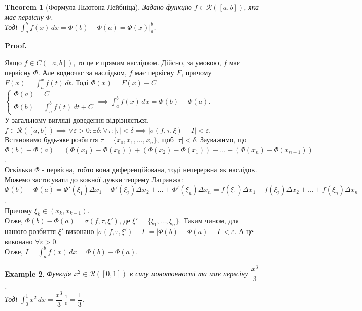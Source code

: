 \documentclass[a4paper, 10pt]{article}
\makeatletter
\def\huge{\displaystyle}
\def\qed{$\blacksquare$}
\theoremstyle{theoremdd}
\newtheorem{theorem}{Theorem}[subsection]
\theoremstyle{theoremdd}
\theoremstyle{theoremdd}
\theoremstyle{theoremdd}
\theoremstyle{theoremdd}
\newtheorem{example}[theorem]{Example}
\theoremstyle{theoremdd}
\theoremstyle{theoremdd}
\theoremstyle{theoremdd}
\theoremstyle{theoremdd}
\renewenvironment{proof}[1][Proof.\\]{\par
\pushQED{\hfill \qed}%
\normalfont \topsep6\p@\@plus6\p@\relax
\trivlist
\item\relax
{\bfseries
#1\@addpunct{.}}\hspace\labelsep\ignorespaces
}{%
\popQED\endtrivlist\@endpefalse
}
\makeatother
\begin{document}
\begin{theorem}[Формула Ньютона-Лейбніца]
Задано функцію $f \in \mathcal{R}([a,b])$, яка має первісну $\Phi$.\\
Тоді $\huge\int_a^b f(x)\,dx = \Phi(b) - \Phi(a) = \Phi(x)\Big|_a^b$.
\end{theorem}

\begin{proof}
Якщо $f \in C([a,b])$, то це є прямим наслідком. Дійсно, за умовою, $f$ має первісну $\Phi$. Але водночас за наслідком, $f$ має первісну $F$, причому $F(x) = \huge\int_a^x f(t)\,dt$. Тоді $\Phi(x) = F(x) + C$\\
$\begin{cases}
\Phi(a) = C \\
\Phi(b) = \huge\int_a^b f(t)\,dt + C
\end{cases} \implies \huge\int_a^b f(x)\,dx = \Phi(b) - \Phi(a)$.
\bigskip \\
У загальному вигляді доведення відрізняється. \\
$f \in \mathcal{R}([a,b]) \implies \forall \varepsilon > 0: \exists \delta: \forall \tau: |\tau| < \delta \implies |\sigma(f, \tau, \xi)-I|<\varepsilon$.\\
Встановимо будь-яке розбиття $\tau = \{x_0,x_1,\dots,x_n\}$, щоб $|\tau| < \delta$. Зауважимо, що\\
$\Phi(b) - \Phi(a) = (\Phi(x_1)-\Phi(x_0)) + (\Phi(x_2)-\Phi(x_1)) + \dots + (\Phi(x_n)-\Phi(x_{n-1}))$.\\
Оскільки $\Phi$ - первісна, тобто вона диференційована, тоді неперервна як наслідок. Можемо застосувати до кожної дужки теорему Лагранжа:\\
$\Phi(b) - \Phi(a) = \Phi'(\xi_1) \Delta x_1 + \Phi'(\xi_2) \Delta x_2 + \dots + \Phi'(\xi_n)\Delta x_n = f(\xi_1)\Delta x_1 + f(\xi_2)\Delta x_2 + \dots + f(\xi_n)\Delta x_n$.\\
Причому $\xi_k \in (x_k,x_{k-1})$.\\
Отже, $\Phi(b) - \Phi(a) = \sigma(f,\tau,\xi')$, де $\xi' = \{\xi_1,\dots,\xi_n\}$. Таким чином, для нашого розбиття $\xi'$ виконано $|\sigma(f,\tau,\xi') - I| = |\Phi(b) - \Phi(a) - I| <\varepsilon$. А це виконано $\forall \varepsilon > 0$.\\
Отже, $I = \huge\int_a^b f(x)\,dx = \Phi(b) - \Phi(a)$.
\end{proof}

\begin{example}
Функція $x^2 \in \mathcal{R}([0,1])$ в силу монотонності та має первсіну $\dfrac{x^3}{3}$. \\ Тоді $\huge\int_0^1 x^2\,dx = \dfrac{x^3}{3} \Big|_0^1 = \dfrac{1}{3}$.
\end{example}
\end{document}
